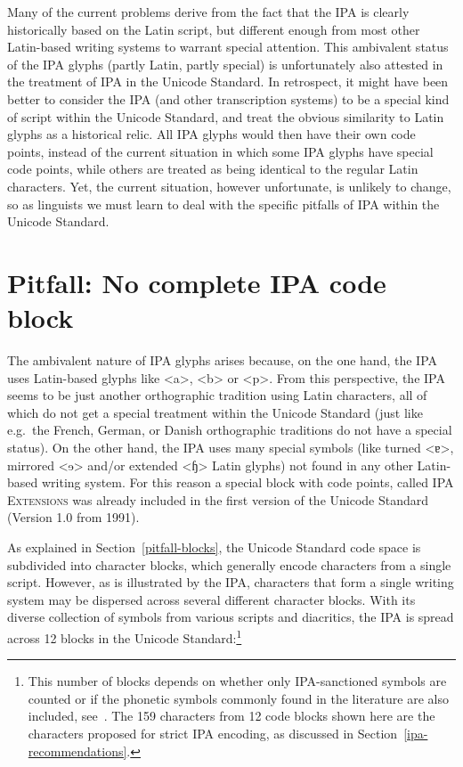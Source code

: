 Many of the current problems derive from the fact that the IPA is clearly
historically based on the Latin script, but different enough from most other
Latin-based writing systems to warrant special attention. This ambivalent status
of the IPA glyphs (partly Latin, partly special) is unfortunately also attested
in the treatment of IPA in the Unicode Standard. In retrospect, it might have
been better to consider the IPA (and other transcription systems) to be a
special kind of script within the Unicode Standard, and treat the obvious
similarity to Latin glyphs as a historical relic. All IPA glyphs would then have
their own code points, instead of the current situation in which some IPA glyphs
have special code points, while others are treated as being identical to the
regular Latin characters. Yet, the current situation, however unfortunate, is
unlikely to change, so as linguists we must learn to deal with the specific
pitfalls of IPA within the Unicode Standard. 

\section{Pitfall: No complete IPA code block}
\label{pitfall-no-complete-ipa-block}

The ambivalent nature of IPA glyphs arises because, on the one hand, the IPA
uses Latin-based glyphs like <a>, <b> or <p>. From this perspective, the IPA
seems to be just another orthographic tradition using Latin characters, all of
which do not get a special treatment within the Unicode Standard (just like
e.g.~the French, German, or Danish orthographic traditions do not have a special
status). On the other hand, the IPA uses many special symbols (like turned <ɐ>,
mirrored <ɘ> and/or extended <ɧ> Latin glyphs) not found in any other Latin-based
writing system. For this reason a special block with code points, called
\textsc{IPA Extensions} was already included in the first version of the Unicode
Standard (Version 1.0 from 1991).

As explained in Section~\ref{pitfall-blocks}, the Unicode Standard code space is
subdivided into character blocks, which generally encode characters from a
single script. However, as is illustrated by the IPA, characters that form a
single writing system may be dispersed across several different character
blocks. With its diverse collection of symbols from various scripts and
diacritics, the IPA is spread across 12 blocks in the Unicode
Standard:\footnote{This number of blocks depends on whether only IPA-sanctioned
symbols are counted or if the phonetic symbols commonly found in the literature
are also included, see~\cite[Appendix~C]{Moran2012}. The 159 characters from 12 
code blocks shown here are the characters proposed for strict IPA encoding, 
as discussed in Section~\ref{ipa-recommendations}.}

